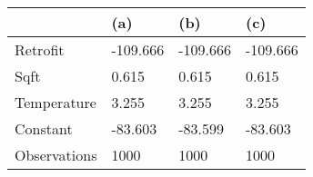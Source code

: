 \begin{tabular}{llll}
\toprule
{} &       (a) &       (b) &       (c) \\
\midrule
Retrofit     &  -109.666 &  -109.666 &  -109.666 \\
Sqft         &     0.615 &     0.615 &     0.615 \\
Temperature  &     3.255 &     3.255 &     3.255 \\
Constant     &   -83.603 &   -83.599 &   -83.603 \\
Observations &      1000 &      1000 &      1000 \\
\bottomrule
\end{tabular}
